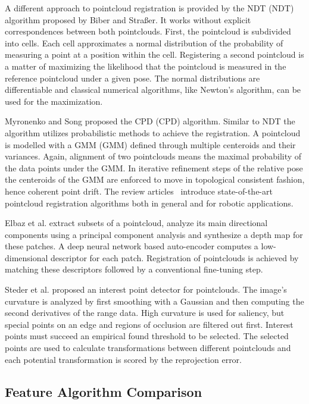 A different approach to pointcloud registration is provided by the \acrlong{NDT} (\acrshort{NDT}) algorithm proposed by Biber and Straßer\cite{biber_iros2003}.
It works without explicit correspondences between both pointclouds.
First, the pointcloud is subdivided into cells.
Each cell approximates a normal distribution of the probability of measuring a point at a position within the cell.
Registering a second pointcloud is a matter of maximizing the likelihood that the pointcloud is measured in the reference pointcloud under a given pose.
The normal distributions are differentiable and classical numerical algorithms, like Newton's algorithm, can be used for the maximization.

Myronenko and Song\cite{myronenko_ieee2010} proposed the \acrlong{CPD} (\acrshort{CPD}) algorithm.
Similar to \acrshort{NDT} the algorithm utilizes probabilistic methods to achieve the registration.
A pointcloud is modelled with a \acrlong{GMM} (\acrshort{GMM}) defined through multiple centeroids and their variances.
Again, alignment of two pointclouds means the maximal probability of the data points under the \acrshort{GMM}.
In iterative refinement steps of the relative pose the centeroids of the \acrshort{GMM} are enforced to move in topological consistent fashion, hence coherent point drift.
The review articles~\cite{bellekens_ambient2014,pomerleau_2015} introduce state-of-the-art pointcloud registration algorithms both in general and for robotic applications.

Elbaz et al.\cite{elbaz_cvpr2017} extract subsets of a pointcloud, analyze its main directional components using a principal component analysis and synthesize a depth map for these patches.
A deep neural network based auto-encoder computes a low-dimensional descriptor for each patch.
Registration of pointclouds is achieved by matching these descriptors followed by a conventional fine-tuning step.

Steder et al.\cite{steder_robot2010} proposed an interest point detector for pointclouds.
The image's curvature is analyzed by first smoothing with a Gaussian and then computing the second derivatives of the range data.
High curvature is used for saliency, but special points on an edge and regions of occlusion are filtered out first.
Interest points must succeed an empirical found threshold to be selected.
The selected points are used to calculate transformations between different pointclouds and each potential transformation is scored by the reprojection error.

\subsection{Feature Algorithm Comparison}

